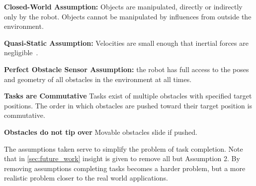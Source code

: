 \begin{assumption}
\label{assumption:closed_world}
\textbf{Closed-World Assumption:} Objects are manipulated, directly or indirectly only by the robot. Objects cannot be manipulated by influences from outside the environment.
\end{assumption}

\begin{assumption}
\label{assumption:quasi_static}
\textbf{Quasi-Static Assumption:} Velocities are small enough that inertial forces are negligible~\cite{stuber_let_2020}.
\end{assumption}

\begin{assumption}
\label{assumption:perfect_obstacle_sensor}
\textbf{Perfect Obstacle Sensor Assumption:} the robot has full access to the poses and geometry of all obstacles in the environment at all times.
\end{assumption}

\begin{assumption}
\label{assumption:order_does_not_matter}
\textbf{Tasks are Commutative} Tasks exist of multiple obstacles with specified target positions. The order in which obstacles are pushed toward their target position is commutative.
\end{assumption}

\begin{assumption}
\label{assumption:no_tipping}
\textbf{Obstacles do not tip over} Movable obstacles slide if pushed.
\end{assumption}


The assumptions taken serve to simplify the problem of task completion. Note that in \cref{sec:future_work} insight is given to remove all but Assumption 2. By removing assumptions completing tasks becomes a harder problem, but a more realistic problem closer to the real world applications.\bs

